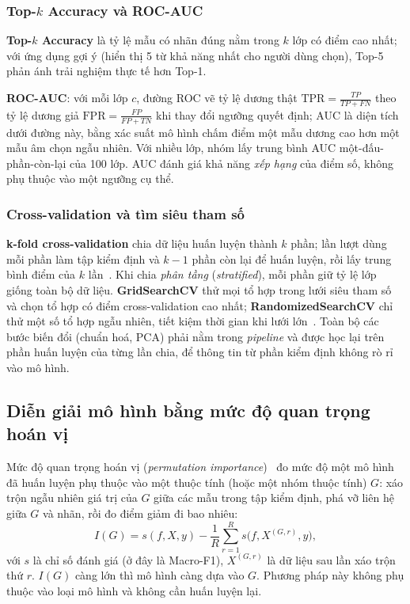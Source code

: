 \subsubsection{Top-$k$ Accuracy và ROC-AUC}
\label{subsubsec:topk_auc}

\textbf{Top-$k$ Accuracy} là tỷ lệ mẫu có nhãn đúng nằm trong $k$ lớp có điểm cao nhất; với ứng dụng gợi ý (hiển thị 5 từ khả năng nhất cho người dùng chọn), Top-5 phản ánh trải nghiệm thực tế hơn Top-1.

\textbf{ROC-AUC}: với mỗi lớp $c$, đường ROC vẽ tỷ lệ dương thật $\text{TPR}=\frac{TP}{TP+FN}$ theo tỷ lệ dương giả $\text{FPR}=\frac{FP}{FP+TN}$ khi thay đổi ngưỡng quyết định; AUC là diện tích dưới đường này, bằng xác suất mô hình chấm điểm một mẫu dương cao hơn một mẫu âm chọn ngẫu nhiên. Với nhiều lớp, nhóm lấy trung bình AUC một-đấu-phần-còn-lại của 100 lớp. AUC đánh giá khả năng \emph{xếp hạng} của điểm số, không phụ thuộc vào một ngưỡng cụ thể.

\subsubsection{Cross-validation và tìm siêu tham số}
\label{subsubsec:cv}

\textbf{k-fold cross-validation} chia dữ liệu huấn luyện thành $k$ phần; lần lượt dùng mỗi phần làm tập kiểm định và $k-1$ phần còn lại để huấn luyện, rồi lấy trung bình điểm của $k$ lần~\cite{han2022}. Khi chia \emph{phân tầng} (\textit{stratified}), mỗi phần giữ tỷ lệ lớp giống toàn bộ dữ liệu. \textbf{GridSearchCV} thử mọi tổ hợp trong lưới siêu tham số và chọn tổ hợp có điểm cross-validation cao nhất; \textbf{RandomizedSearchCV} chỉ thử một số tổ hợp ngẫu nhiên, tiết kiệm thời gian khi lưới lớn~\cite{sklearn}. Toàn bộ các bước biến đổi (chuẩn hoá, PCA) phải nằm trong \textit{pipeline} và được học lại trên phần huấn luyện của từng lần chia, để thông tin từ phần kiểm định không rò rỉ vào mô hình.

\subsection{Diễn giải mô hình bằng mức độ quan trọng hoán vị}
\label{subsec:permutation}

Mức độ quan trọng hoán vị (\textit{permutation importance})~\cite{sklearn} đo mức độ một mô hình đã huấn luyện phụ thuộc vào một thuộc tính (hoặc một nhóm thuộc tính) $G$: xáo trộn ngẫu nhiên giá trị của $G$ giữa các mẫu trong tập kiểm định, phá vỡ liên hệ giữa $G$ và nhãn, rồi đo điểm giảm đi bao nhiêu:
\begin{equation}
  I(G) = s(f, X, y) - \frac{1}{R}\sum_{r=1}^{R} s\big(f, X^{(G,r)}, y\big),
\end{equation}
với $s$ là chỉ số đánh giá (ở đây là Macro-F1), $X^{(G,r)}$ là dữ liệu sau lần xáo trộn thứ $r$. $I(G)$ càng lớn thì mô hình càng dựa vào $G$. Phương pháp này không phụ thuộc vào loại mô hình và không cần huấn luyện lại.
